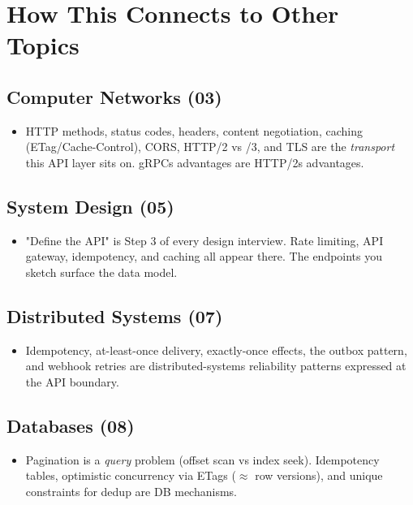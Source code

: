 \documentclass[11pt]{article}
\providecommand{\tightlist}{\setlength{\itemsep}{1pt}\setlength{\parskip}{0pt}}
\begin{document}
\section{How This Connects to Other Topics}\label{how-this-connects-to-other-topics}

\subsection{Computer Networks (03)}\label{computer-networks-03}

\begin{itemize}
\tightlist
\item
  HTTP methods, status codes, headers, content negotiation, caching (ETag/Cache-Control), CORS, HTTP/2 vs /3, and TLS are the \emph{transport} this API layer sits on. gRPC\textquotesingle s advantages are HTTP/2\textquotesingle s advantages.
\end{itemize}

\subsection{System Design (05)}\label{system-design-05}

\begin{itemize}
\tightlist
\item
  "Define the API" is Step 3 of every design interview. Rate limiting, API gateway, idempotency, and caching all appear there. The endpoints you sketch surface the data model.
\end{itemize}

\subsection{Distributed Systems (07)}\label{distributed-systems-07}

\begin{itemize}
\tightlist
\item
  Idempotency, at-least-once delivery, exactly-once effects, the outbox pattern, and webhook retries are distributed-systems reliability patterns expressed at the API boundary.
\end{itemize}

\subsection{Databases (08)}\label{databases-08}

\begin{itemize}
\tightlist
\item
  Pagination is a \emph{query} problem (offset scan vs index seek). Idempotency tables, optimistic concurrency via ETags (\(\approx\) row versions), and unique constraints for dedup are DB mechanisms.
\end{itemize}
\end{document}
